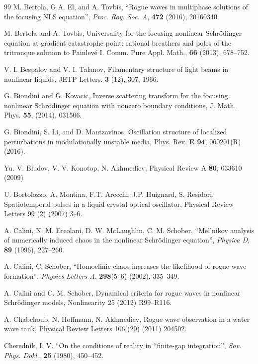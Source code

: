 \documentclass[12pt]{article}
\begin{document}
\begin{thebibliography}{99}
 M. Bertola, G.A. El, and A. Tovbis, ``Rogue waves in multiphase solutions of the
focusing NLS equation'', \textit{Proc. Roy. Soc. A}, \textbf{472} (2016), 20160340.

 M. Bertola and A. Tovbis, Universality for the focusing nonlinear Schr\"odinger equation
at gradient catastrophe point: rational breathers and poles of the tritronque solution
to Painlev\'e I. Comm. Pure Appl. Math., {\bf 66} (2013), 678--752.

 V. I. Bespalov and V. I. Talanov, Filamentary structure of light beams in nonlinear liquids, JETP Letters. {\bf 3} (12), 307, 1966.

 G. Biondini and G. Kovacic, Inverse scattering transform for the focusing nonlinear Schr\"odinger equation with nonzero boundary conditions, J. Math. Phys. {\bf 55}, (2014), 031506.

 G. Biondini, S. Li, and D. Mantzavinos, Oscillation structure of localized perturbations in modulationally unstable media, Phys. Rev. {\bf E 94}, 060201(R) (2016).

 Yu. V. Bludov, V. V. Konotop, N. Akhmediev, Physical Review A {\bf 80}, 033610 (2009)

 U. Bortolozzo, A. Montina, F.T. Arecchi, J.P. Huignard, S. Residori, Spatiotemporal pulses in a liquid crystal optical oscillator, Physical Review Letters 99 (2) (2007) 3--6.

 A. Calini, N. M. Ercolani, D. W. McLaughlin, C. M. Schober, ``Mel'nikov analysis of numerically induced chaos in the nonlinear Schr\"odinger equation'', \textit{Physica D}, \textbf{89} (1996), 227--260.

 A. Calini, C. Schober, ``Homoclinic chaos increases the likelihood of rogue wave formation'', \textit{Physics Letters A}, \textbf{298}(5--6) (2002), 335--349.

 A. Calini and C. M. Schober, Dynamical criteria for rogue waves in nonlinear Schr\"odinger models, Nonlinearity 25 (2012) R99--R116.

 A. Chabchoub, N. Hoffmann, N. Akhmediev, Rogue wave observation in a water wave tank, Physical Review Letters 106 (20) (2011) 204502.

 Cherednik, I. V. ``On the conditions of reality in “finite-gap integration'', \textit{Sov. Phys. Dokl.}, \textbf{25} (1980), 450--452.


\end{thebibliography}
\end{document}
